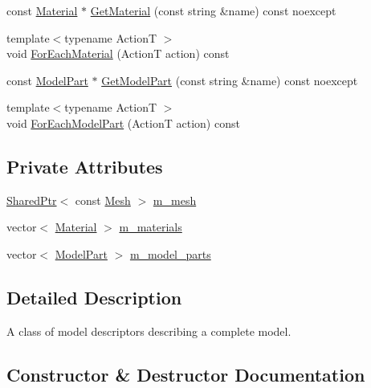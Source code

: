 \begin{DoxyCompactItemize}
\item 
const \hyperlink{classmage_1_1_material}{Material} $\ast$ \hyperlink{classmage_1_1_model_descriptor_adc013e6b054c7efa0d92a3ad1ff37e61}{Get\+Material} (const string \&name) const noexcept
\item 
{\footnotesize template$<$typename ActionT $>$ }\\void \hyperlink{classmage_1_1_model_descriptor_ac4723e18238b0d6ac3c54168b8e9a09f}{For\+Each\+Material} (ActionT action) const
\item 
const \hyperlink{structmage_1_1_model_part}{Model\+Part} $\ast$ \hyperlink{classmage_1_1_model_descriptor_a9c8e98d71883edd33b9d6c1964e7bf36}{Get\+Model\+Part} (const string \&name) const noexcept
\item 
{\footnotesize template$<$typename ActionT $>$ }\\void \hyperlink{classmage_1_1_model_descriptor_a1d61699788385cf29726fac0067bcb5c}{For\+Each\+Model\+Part} (ActionT action) const
\end{DoxyCompactItemize}
\subsection*{Private Attributes}
\begin{DoxyCompactItemize}
\item 
\hyperlink{namespacemage_a1e01ae66713838a7a67d30e44c67703e}{Shared\+Ptr}$<$ const \hyperlink{classmage_1_1_mesh}{Mesh} $>$ \hyperlink{classmage_1_1_model_descriptor_a675b02d184e775c03c05006f8fa9aeb4}{m\+\_\+mesh}
\item 
vector$<$ \hyperlink{classmage_1_1_material}{Material} $>$ \hyperlink{classmage_1_1_model_descriptor_a672238b257f99836243d84f634ffeea2}{m\+\_\+materials}
\item 
vector$<$ \hyperlink{structmage_1_1_model_part}{Model\+Part} $>$ \hyperlink{classmage_1_1_model_descriptor_a200c6e44c9b6a5bde5c8490fb93ba00f}{m\+\_\+model\+\_\+parts}
\end{DoxyCompactItemize}


\subsection{Detailed Description}
A class of model descriptors describing a complete model. 

\subsection{Constructor \& Destructor Documentation}
\hypertarget{classmage_1_1_model_descriptor_ab2668f353052165023161d146995ef26}{}\label{classmage_1_1_model_descriptor_ab2668f353052165023161d146995ef26} 

